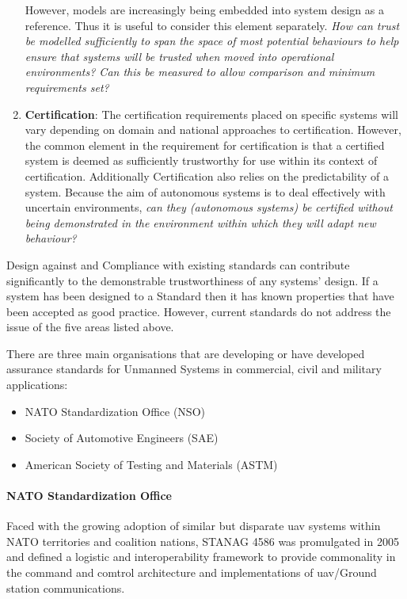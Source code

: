 \begin{enumerate}
    However, models are increasingly being embedded into system design as a reference.
    Thus it is useful to consider this element separately.
    \textit{How can trust be modelled sufficiently to span the space of most potential behaviours to help ensure that systems will be trusted when moved into operational environments?
    Can this be measured to allow comparison and minimum requirements set?}
  \item \textbf{Certification}: The certification requirements placed on specific systems will vary depending on domain and national approaches to certification.
    However, the common element in the requirement for certification is that a certified system is deemed as sufficiently trustworthy for use within its context of certification.
    Additionally Certification also relies on the predictability of a system.
    Because the aim of autonomous systems is to deal effectively with uncertain environments, \textit{can they (autonomous systems) be certified without being demonstrated in the environment within which they will adapt new behaviour?}
\end{enumerate}

Design against and Compliance with existing standards can contribute significantly to the demonstrable trustworthiness of any systems’ design.
If a system has been designed to a Standard then it has known properties that have been accepted as good practice.
However, current standards do not address the issue of the five areas listed above.

There are three main organisations that are developing or have developed assurance standards for Unmanned Systems in commercial, civil and military applications:

\begin{itemize}
  \item NATO Standardization Office (NSO)
  \item Society of Automotive Engineers (SAE)
  \item American Society of Testing and Materials (ASTM)
\end{itemize}

\paragraph{NATO Standardization Office}
Faced with the growing adoption of similar but disparate \gls{uav} systems within NATO territories and coalition nations, STANAG 4586\cite{STANAG4586} was promulgated in 2005 and defined a logistic and interoperability framework to provide commonality in the command and comtrol architecture and implementations of \gls{uav}/Ground station communications.

